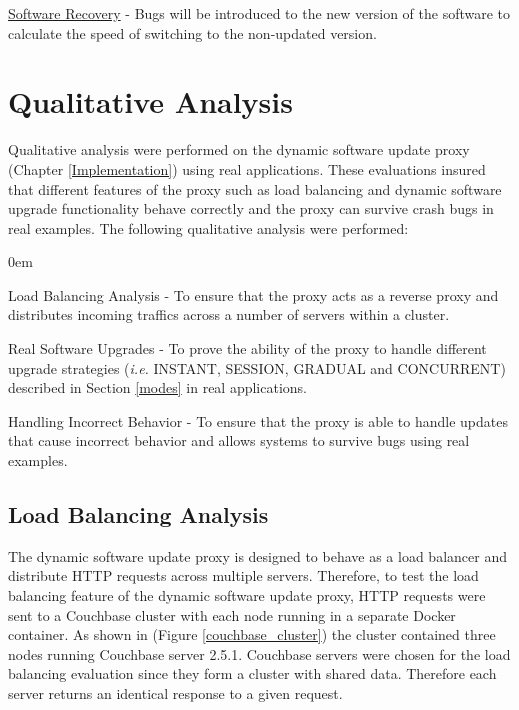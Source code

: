\documentclass[a4paper,11pt,twoside]{report}
\begin{document}
\noindent
\underline{Software Recovery} - Bugs will be introduced to the new version of the software to calculate the speed of switching to the non-updated version. 
 
\section{Qualitative Analysis}
Qualitative analysis were performed on the dynamic software update proxy (Chapter \ref{Implementation})  using real applications. These evaluations insured that different features of the proxy such as load balancing and dynamic software upgrade functionality behave correctly and the proxy can survive crash bugs in real examples. The following qualitative analysis were performed: 

\begin{list}{-}{}
  \itemsep0em
  \item{Load Balancing Analysis} - To ensure that the proxy acts as a reverse proxy and distributes incoming traffics across a number of servers within a cluster. 

  \item{Real Software Upgrades} - To prove the ability of the proxy to handle different upgrade strategies (\textit{i.e.} INSTANT, SESSION, GRADUAL and CONCURRENT) described in Section \ref{modes} in real applications. 
  
   \item{Handling Incorrect Behavior} - To ensure that the proxy is able to handle updates that cause incorrect behavior and allows systems to survive bugs using real examples. 
\end{list} 

\subsection{Load Balancing Analysis}
The dynamic software update proxy is designed to behave as a load balancer and distribute  HTTP requests across multiple servers. Therefore, to test the load balancing feature of the dynamic software update proxy, HTTP requests were sent to a Couchbase cluster with each node running in a separate Docker container. As shown in (Figure \ref{couchbase_cluster}) the cluster contained three nodes running Couchbase server 2.5.1.  Couchbase servers were chosen for the load balancing evaluation since they form a cluster with shared data. Therefore each server returns an identical response to a given request.
\end{document}
